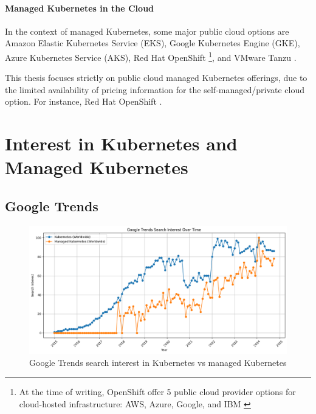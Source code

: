 \paragraph{Managed Kubernetes in the Cloud}\mbox{}

In the context of managed Kubernetes, some major public cloud options are Amazon Elastic Kubernetes Service (EKS), Google Kubernetes Engine (GKE), Azure Kubernetes Service (AKS), Red Hat OpenShift \footnote{At the time of writing, OpenShift offer 5 public cloud provider options for cloud-hosted infrastructure: AWS, Azure, Google, and IBM \cite{OpenShiftContainerPlatform}}, and VMware Tanzu \cite{AmazonEKSCustomers, maEurekaHumanLevelReward2023, nickomangAzureKubernetesService, redhatinc.RedHatOpenShift, VMwareTanzuPlatform}.

This thesis focuses strictly on public cloud managed Kubernetes offerings, due to the limited availability of pricing information for the self-managed/private cloud option. For instance, Red Hat OpenShift \cite{redhatinc.RedHatOpenShift}.



\section{Interest in Kubernetes and Managed Kubernetes}

\subsection{Google Trends}

\FloatBarrier  

\begin{figure}
    \centering
    \includegraphics[width=1\linewidth]{resources/d2a89eeeda76d50039bc6f5d3a97c41b.png}
    \caption{Google Trends search interest in Kubernetes vs managed Kubernetes}
    \label{fig:search-interests-kubernetes-vs-managed-kubernetes}
\end{figure}

